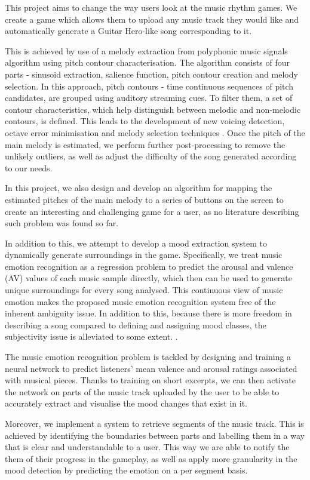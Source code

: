 This project aims to change the way users look at the music rhythm games. We create a game which allows them to upload any music track they would like and automatically generate a Guitar Hero-like song corresponding to it. 

This is achieved by use of a melody extraction from polyphonic music signals algorithm using pitch contour characterisation. The algorithm consists of four parts - sinusoid extraction, salience function, pitch contour creation and melody selection. In this approach, pitch contours - time continuous sequences of pitch candidates, are grouped using auditory streaming cues. To filter them, a set of contour characteristics, which help distinguish between melodic and non-melodic contours, is defined. This leads to the development of new voicing detection, octave error minimisation and melody selection techniques \cite{salamon}. Once the pitch of the main melody is estimated, we perform further post-processing to remove the unlikely outliers, as well as adjust the difficulty of the song generated according to our needs.

In this project, we also design and develop an algorithm for mapping the estimated pitches of the main melody to a series of buttons on the screen to create an interesting and challenging game for a user, as no literature describing such problem was found so far.

In addition to this, we attempt to develop a mood extraction system to dynamically generate surroundings in the game. Specifically, we treat music emotion recognition as a regression problem to predict the arousal and valence (AV) values of each music sample directly, which then can be used to generate unique surroundings for every song analysed. This continuous view of music emotion makes the proposed music emotion recognition system free of the inherent ambiguity issue. In addition to this, because there is more freedom in describing a song compared to defining and assigning mood classes, the subjectivity issue is alleviated to some extent. \cite{mood}.

The music emotion recognition problem is tackled by designing and training a neural network to predict listeners’ mean valence and arousal ratings associated with musical pieces. Thanks to training on short excerpts, we can then activate the network on parts of the music track uploaded by the user to be able to accurately extract and visualise the mood changes that exist in it.

Moreover, we implement a system to retrieve segments of the music track. This is achieved by identifying the boundaries between parts and labelling them in a way that is clear and understandable to a user. This way we are able to notify the them of their progress in the gameplay, as well as apply more granularity in the mood detection by predicting the emotion on a per segment basis.

